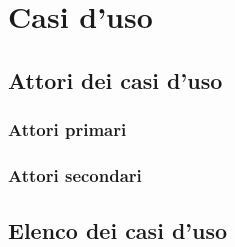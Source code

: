 \section{Casi d'uso}
\subsection{Attori dei casi d'uso}
\subsubsection{Attori primari}
\subsubsection{Attori secondari}
\subsection{Elenco dei casi d'uso}

